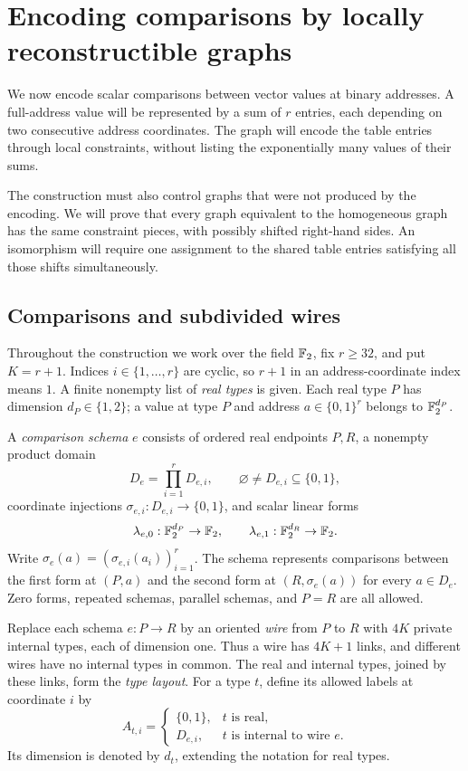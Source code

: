\section{Encoding comparisons by locally reconstructible graphs}
\label{sec:encoding}

We now encode scalar comparisons between vector values at binary
addresses. A full-address value will be represented by a sum of $r$
entries, each depending on two consecutive address coordinates. The graph
will encode the table entries through local constraints, without listing
the exponentially many values of their sums.

The construction must also control graphs that were not produced by the
encoding. We will prove that every graph equivalent to the homogeneous
graph has the same constraint pieces, with possibly shifted right-hand
sides. An isomorphism will require one assignment to the shared table
entries satisfying all those shifts simultaneously.

\subsection{Comparisons and subdivided wires}

Throughout the construction we work over the field $\mathbb F_2$, fix
$r\ge 32$, and put $K=r+1$. Indices $i\in\{1,\ldots,r\}$ are cyclic, so
$r+1$ in an address-coordinate index means $1$. A finite nonempty
list of \emph{real types} is given. Each real type $P$ has dimension
$d_P\in\{1,2\}$; a value at type $P$ and address
$a\in\{0,1\}^r$ belongs to $\mathbb F_2^{d_P}$.

A \emph{comparison schema} $e$ consists of ordered real endpoints
$P,R$, a nonempty product domain
\[
D_e=\prod_{i=1}^r D_{e,i},
\qquad \varnothing\ne D_{e,i}\subseteq\{0,1\},
\]
coordinate injections $\sigma_{e,i}:D_{e,i}\to\{0,1\}$, and
scalar linear forms
\[
\lambda_{e,0}:\mathbb F_2^{d_P}\to\mathbb F_2,
\qquad
\lambda_{e,1}:\mathbb F_2^{d_R}\to\mathbb F_2.
\]
Write $\sigma_e(a)=(\sigma_{e,i}(a_i))_{i=1}^r$. The schema
represents comparisons between the first form at $(P,a)$ and the
second form at $(R,\sigma_e(a))$ for every $a\in D_e$. Zero
forms, repeated schemas, parallel schemas, and $P=R$ are all
allowed.

Replace each schema $e:P\to R$ by an oriented \emph{wire}
from $P$ to $R$ with $4K$ private internal types, each of dimension
one. Thus a wire has $4K+1$ links, and different wires have no
internal types in common. The real and internal types, joined by
these links, form the \emph{type layout}. For a type $t$, define its
allowed labels at coordinate $i$ by
\[
A_{t,i}=
\begin{cases}
\{0,1\},&t\text{ is real},\\
D_{e,i},&t\text{ is internal to wire }e.
\end{cases}
\]
Its dimension is denoted by $d_t$, extending the notation for real
types.

